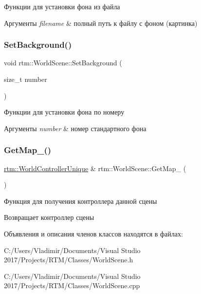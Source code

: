 Функции для установки фона из файла 


\begin{DoxyParams}{Аргументы}
{\em filename} & полный путь к файлу с фоном (картинка) \\
\hline
\end{DoxyParams}
\mbox{\label{classrtm_1_1_world_scene_a097fa828c003f8757faf1aebdd0e63f1}} 
\subsubsection{\texorpdfstring{Set\+Background()}{SetBackground()}\hspace{0.1cm}{\footnotesize\ttfamily [2/2]}}
{\footnotesize\ttfamily void rtm\+::\+World\+Scene\+::\+Set\+Background (\begin{DoxyParamCaption}\item[{size\+\_\+t}]{number }\end{DoxyParamCaption})}



Функции для установки фона по номеру 


\begin{DoxyParams}{Аргументы}
{\em number} & номер стандартного фона \\
\hline
\end{DoxyParams}
\mbox{\label{classrtm_1_1_world_scene_a8995a69857907834953be1bb2ccb2845}} 
\subsubsection{\texorpdfstring{Get\+Map\+\_\+()}{GetMap\_()}}
{\footnotesize\ttfamily \hyperlink{namespacertm_a3081db54851f6008db32c1ee28d14ecf}{rtm\+::\+World\+Controller\+Unique} \& rtm\+::\+World\+Scene\+::\+Get\+Map\+\_\+ (\begin{DoxyParamCaption}{ }\end{DoxyParamCaption})\hspace{0.3cm}{\ttfamily [private]}}



Функция для получения контроллера данной сцены 

\begin{DoxyReturn}{Возвращает}
контроллер сцены 
\end{DoxyReturn}


Объявления и описания членов классов находятся в файлах\+:\begin{DoxyCompactItemize}
\item 
C\+:/\+Users/\+Vladimir/\+Documents/\+Visual Studio 2017/\+Projects/\+R\+T\+M/\+Classes/World\+Scene.\+h\item 
C\+:/\+Users/\+Vladimir/\+Documents/\+Visual Studio 2017/\+Projects/\+R\+T\+M/\+Classes/World\+Scene.\+cpp\end{DoxyCompactItemize}
